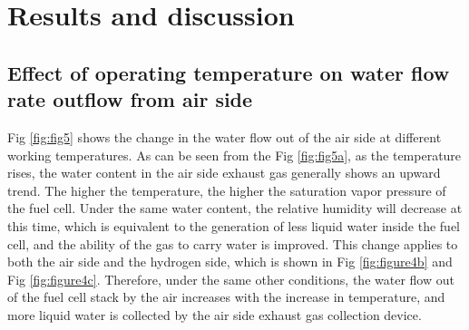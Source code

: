 \section{Results and discussion}
\subsection{Effect of operating temperature on water flow rate outflow from air side}

Fig \ref{fig:fig5} shows the change in the water flow out of the air side at different working temperatures. As can be seen from the Fig \ref{fig:fig5a}, as the temperature rises, the water content in the air side exhaust gas generally shows an upward trend. The higher the temperature, the higher the saturation vapor pressure of the fuel cell. Under the same water content, the relative humidity will decrease at this time, which is equivalent to the generation of less liquid water inside the fuel cell, and the ability of the gas to carry water is improved. This change applies to both the air side and the hydrogen side, which is shown in Fig \ref{fig:figure4b} and Fig \ref{fig:figure4c}. Therefore, under the same other conditions, the water flow out of the fuel cell stack by the air increases with the increase in temperature, and more liquid water is collected by the air side exhaust gas collection device.



